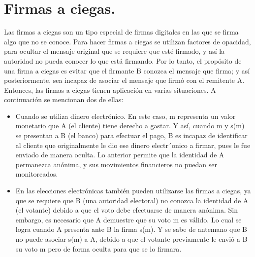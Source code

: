 \section{Firmas a ciegas. }

Las firmas a ciegas son un tipo especial de firmas digitales en las que se firma algo que no se conoce. Para hacer firmas a ciegas se utilizan factores de opacidad, para ocultar el mensaje original que se requiere que esté firmado, y así la autoridad no pueda conocer lo que está firmando.
Por lo tanto, el propósito de una firma a ciegas es evitar que el firmante B conozca el mensaje que firma; y así posteriormente, sea incapaz de asociar el mensaje que firmó con el remitente A. Entonces, las firmas a ciegas tienen aplicación en varias situaciones. A continuación se mencionan dos de ellas:
\begin{itemize}
	\item Cuando se utiliza dinero electrónico. En este caso, m representa un valor monetario que A (el cliente) tiene derecho a gastar. Y así, cuando m y s(m) se presentan a B (el banco) para efectuar el pago, B es incapaz de identificar al cliente que originalmente le dio ese dinero electr´onico a firmar, pues le fue enviado de manera oculta. Lo anterior permite que la identidad de A permanezca anónima, y sus movimientos financieros no puedan ser monitoreados.
	\item En las elecciones electrónicas también pueden utilizarse las firmas a ciegas, ya que se requiere que B (una autoridad electoral) no conozca la identidad de A (el votante) debido a que el voto debe efectuarse de manera anónima. Sin embargo, es necesario que A demuestre que su voto m es válido. Lo cual se logra cuando A presenta ante B la firma s(m). Y se sabe de antemano que B no puede asociar s(m) a A, debido a que el votante previamente le envió a B su voto m pero de forma oculta para que se lo firmara. ~\cite{ciegas}
\end{itemize} 

